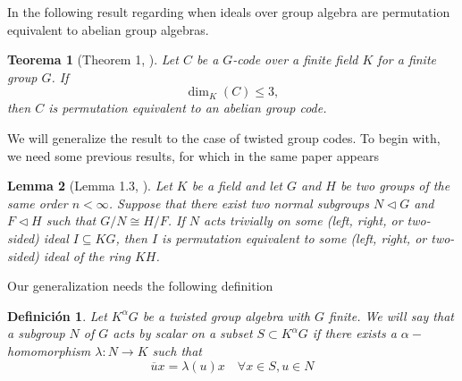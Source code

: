 \documentclass{article}
\newtheorem{theorem}{Teorema}
\newtheorem{lemma}[theorem]{Lemma}
\newtheorem{definition}{Definición}
\begin{document}
In \cite{GARCIAPILLADO2019167} the following result regarding when ideals over group algebra are permutation equivalent to abelian group algebras.
\begin{theorem}[Theorem 1, \cite{GARCIAPILLADO2019167}]
    Let $C$ be a $G$-code over a finite field $K$ for a finite group $G$. If
\[
\dim_K(C) \le 3,
\]
then $C$ is permutation equivalent to an abelian group code.
\end{theorem}
We will generalize the result to the case of twisted group codes. To begin with, we need some previous results, for which in the same paper appears
\begin{lemma}[Lemma 1.3, \cite{GARCIAPILLADO2019167}]
    Let $K$ be a field and let $G$ and $H$ be two groups of the same order
$n < \infty$. Suppose that there exist two normal subgroups $N \triangleleft G$
and $F \triangleleft H$ such that $G/N \cong H/F$. If $N$ acts trivially on some
(left, right, or two-sided) ideal $I \subseteq KG$, then $I$ is permutation
equivalent to some (left, right, or two-sided) ideal of the ring $KH$.
\end{lemma}

Our generalization needs the following definition

\begin{definition}
    Let $K^\alpha G$ be a twisted group algebra with $G$ finite. We will say that a subgroup $N$ of $G$ acts by scalar on a subset $S\subset K^\alpha G$ if there exists a $\alpha-$ homomorphism $\lambda: N \longrightarrow K$ such that
    \begin{equation}
        \overline{u} x = \lambda(u) x \quad \forall x\in S, u\in N
    \end{equation}
\end{definition}
\end{document}
